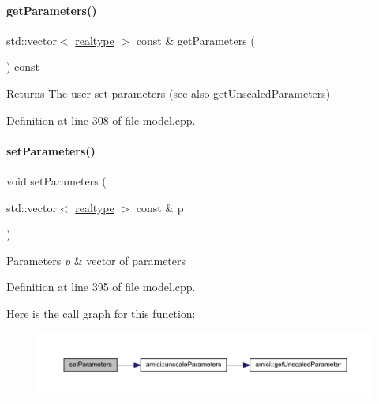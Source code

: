 \paragraph{\texorpdfstring{get\+Parameters()}{getParameters()}}
{\footnotesize\ttfamily std\+::vector$<$ \mbox{\hyperlink{namespaceamici_a1bdce28051d6a53868f7ccbf5f2c14a3}{realtype}} $>$ const  \& get\+Parameters (\begin{DoxyParamCaption}{ }\end{DoxyParamCaption}) const}

\begin{DoxyReturn}{Returns}
The user-\/set parameters (see also get\+Unscaled\+Parameters) 
\end{DoxyReturn}


Definition at line 308 of file model.\+cpp.

\mbox{\label{classamici_1_1_model_af1e95f6479d442fcb4c63d16763d4acd}} 
\paragraph{\texorpdfstring{set\+Parameters()}{setParameters()}}
{\footnotesize\ttfamily void set\+Parameters (\begin{DoxyParamCaption}\item[{std\+::vector$<$ \mbox{\hyperlink{namespaceamici_a1bdce28051d6a53868f7ccbf5f2c14a3}{realtype}} $>$ const \&}]{p }\end{DoxyParamCaption})}


\begin{DoxyParams}{Parameters}
{\em p} & vector of parameters \\
\hline
\end{DoxyParams}


Definition at line 395 of file model.\+cpp.

Here is the call graph for this function\+:
\nopagebreak
\begin{figure}[H]
\begin{center}
\leavevmode
\includegraphics[width=350pt]{classamici_1_1_model_af1e95f6479d442fcb4c63d16763d4acd_cgraph}
\end{center}
\end{figure}
\mbox{\label{classamici_1_1_model_a76f62d983fb3842cb695681f7ed9a9f0}} 
